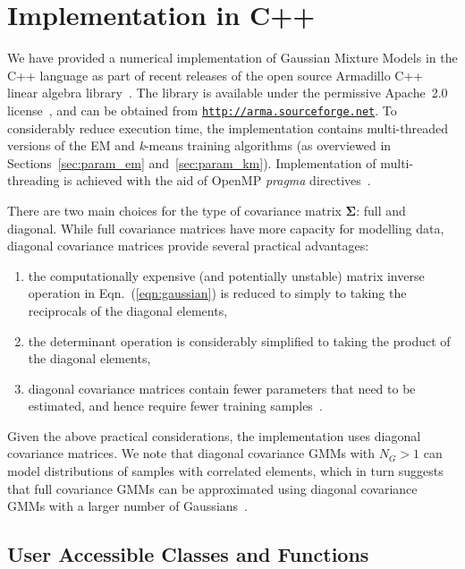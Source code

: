 \documentclass[10pt,a4paper]{article}
\def\Mat#1{{\boldsymbol{#1}}}
\begin{document}
\newpage
\section{Implementation in C++}
\label{sec:implementation}

We have provided a numerical implementation of Gaussian Mixture Models in the C++ language
as part of recent releases of the open source Armadillo C++ linear algebra library~\cite{Armadillo_JOSS_2016}. %
The library is available under the permissive Apache~2.0 license~\cite{Laurent_2008},
and can be obtained from
\href{http://arma.sourceforge.net}{\tt http://arma.sourceforge.net}.
To considerably reduce execution time,
the implementation contains multi-threaded versions of the EM and {\it k}-means training algorithms
(as overviewed in Sections~\ref{sec:param_em} and~\ref{sec:param_km}).
Implementation of multi-threading is achieved with the aid of OpenMP {\it pragma} directives~\cite{OpenMP_2007}.

There are two main choices for the type of covariance matrix $\Mat{\Sigma}$: full and diagonal.
While full covariance matrices have more capacity for modelling data,
diagonal covariance matrices provide several practical advantages:
%
\begin{enumerate}[{\bf (i)}]
\item
the computationally expensive (and potentially unstable) matrix inverse operation in Eqn.~(\ref{eqn:gaussian})
is reduced to simply to taking the reciprocals of the diagonal elements,

\item
the determinant operation is considerably simplified to taking the product of the diagonal elements,

\item
diagonal covariance matrices contain fewer parameters that need to be estimated, and hence require fewer training samples~\cite{Duda01}.
\end{enumerate}

Given the above practical considerations, the implementation uses diagonal covariance matrices.
We note that diagonal covariance GMMs with $N_G > 1$ can model distributions of samples with correlated elements,
which in turn suggests that full covariance GMMs can be approximated using diagonal covariance GMMs with a larger number of Gaussians~\cite{Reynolds_2000}.



\subsection{User Accessible Classes and Functions}
\end{document}
